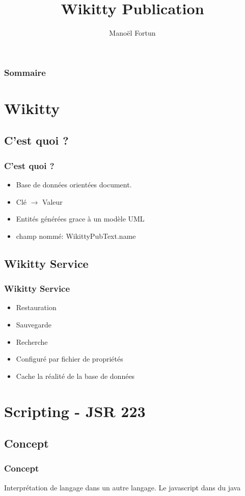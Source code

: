 \documentclass[12pt,a4paper,utf8x]{beamer}
\begin{document}
\title{Wikitty Publication}  
\author{Manoël Fortun}

\begin{frame}
\titlepage
\end{frame}

\begin{frame}\frametitle{Sommaire}\tableofcontents
\end{frame} 


\section{Wikitty} 
\subsection{C'est quoi ?}
\begin{frame}\frametitle{C'est quoi ?} 
\begin{itemize}
\item Base de données orientées document.
\item Clé $\to$ Valeur
\item Entités générées grace à un modèle UML
\item champ nommé: WikittyPubText.name
\end{itemize}
\end{frame}

\subsection{Wikitty Service}
\begin{frame} \frametitle{Wikitty Service} 
\begin{itemize}
\item Restauration 
\item Sauvegarde
\item Recherche
\item Configuré par fichier de propriétés
\item Cache la réalité de la base de données
\end{itemize}
\end{frame}


\section{Scripting - JSR 223}
\subsection{Concept}
\begin{frame}\frametitle{Concept}
Interprétation de langage dans un autre langage.
Le javascript dans du java
\end{frame}
\end{document}
